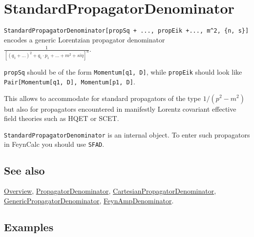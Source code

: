 \documentclass[../FeynCalcManual.tex]{subfiles}
\begin{document}
\hypertarget{standardpropagatordenominator}{%
\section{StandardPropagatorDenominator}\label{standardpropagatordenominator}}

\texttt{StandardPropagatorDenominator[\allowbreak{}propSq + ...,\ \allowbreak{}propEik +...,\ \allowbreak{}m^2,\ \allowbreak{}\{\allowbreak{}n,\ \allowbreak{}s\}]}
encodes a generic Lorentzian propagator denominator
\(\frac{1}{[(q_1+ \ldots)^2 + q_1 \cdot p_1 + \ldots + m^2 + s i \eta]^n}\).

\texttt{propSq} should be of the form
\texttt{Momentum[\allowbreak{}q1,\ \allowbreak{}D]}, while
\texttt{propEik} should look like
\texttt{Pair[\allowbreak{}Momentum[\allowbreak{}q1,\ \allowbreak{}D],\ \allowbreak{}Momentum[\allowbreak{}p1,\ \allowbreak{}D]}.

This allows to accommodate for standard propagators of the type
\(1/(p^2-m^2)\) but also for propagators encountered in manifestly
Lorentz covariant effective field theories such as HQET or SCET.

\texttt{StandardPropagatorDenominator} is an internal object. To enter
such propagators in FeynCalc you should use \texttt{SFAD}.

\subsection{See also}

\hyperlink{toc}{Overview},
\hyperlink{propagatordenominator}{PropagatorDenominator},
\hyperlink{cartesianpropagatordenominator}{CartesianPropagatorDenominator},
\hyperlink{genericpropagatordenominator}{GenericPropagatorDenominator},
\hyperlink{feynampdenominator}{FeynAmpDenominator}.

\subsection{Examples}

\begin{Shaded}
\begin{Highlighting}[]
\OperatorTok{[}\OperatorTok{[}\OperatorTok{[}\OperatorTok{,} \OperatorTok{],} \OperatorTok{,} \SpecialCharTok{{-}}\SpecialCharTok{\^{}}\OperatorTok{,} \OperatorTok{\{}\OperatorTok{,} \OperatorTok{\}]]}
\end{Highlighting}
\end{Shaded}
\end{document}

